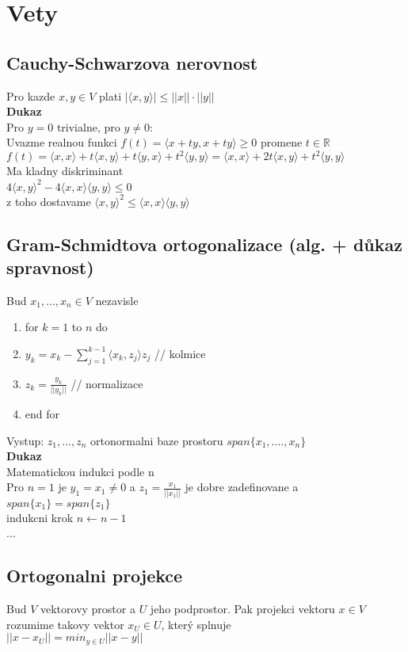 \documentclass[a4paper]{article}
\begin{document}
\section*{Vety}
\subsection*{Cauchy-Schwarzova nerovnost}
Pro kazde $x,y \in V$ plati $|\langle x,y \rangle| \leq ||x|| \cdot ||y||$
\\
\textbf{Dukaz}\\
Pro $y=0$ trivialne, pro $y\neq0$:\\
Uvazme realnou funkci $f(t)=\langle x+ty,x+ty \rangle \geq 0$ promene $t\in\mathbb{R}$\\
$f(t)=\langle x,x \rangle + t\langle x,y \rangle + t\langle y,x \rangle + t^2\langle y,y \rangle=
\langle x,x \rangle + 2t \langle x,y \rangle + t^2 \langle y,y \rangle$\\
Ma kladny diskriminant\\
$4\langle x,y \rangle^2 - 4\langle x,x \rangle\langle y,y \rangle \leq 0$\\
z toho dostavame
$\langle x,y \rangle^2\leq\langle x,x \rangle\langle y,y \rangle$


\subsection*{Gram-Schmidtova ortogonalizace (alg. + důkaz spravnost)}
Bud $x_1, ..., x_n \in V$ nezavisle\\
\begin{enumerate}
	\item for $k=1$ to $n$ do
	\item $y_k = x_k - \sum_{j=1}^{k-1}\langle x_k,z_j \rangle z_j$ // kolmice
	\item $z_k = \frac{y_k}{||y_k||}$ // normalizace
	\item end for
\end{enumerate}
Vystup: $z_1, ...,z_n$ ortonormalni baze prostoru $span\{x_1, ...., x_n\}$\\
\textbf{Dukaz}\\
Matematickou indukci podle n\\
Pro $n=1$ je $y_1=x_1\neq 0$ a $z_1 = \frac{x_1}{||x_1||}$ je 
dobre zadefinovane a $span\{x_1\} = span\{z_1\}$\\
indukcni krok $n \gets n-1$\\
...


\subsection*{Ortogonalni projekce}
Bud $V$ vektorovy prostor a $U$ jeho podprostor.
Pak projekci vektoru $x \in V$ rozumime takovy vektor $x_U \in U$,
který splnuje\\
$||x - x_U|| = min_{y\in U} ||x - y||$
\end{document}
